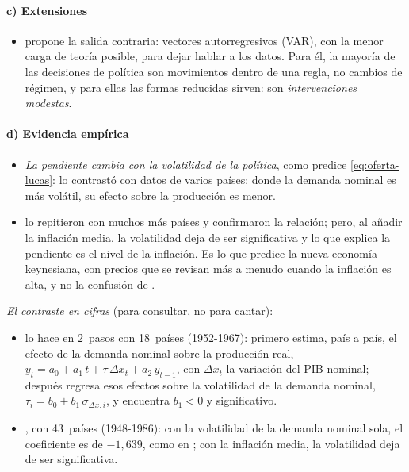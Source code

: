 \documentclass[11pt]{article}
\begin{document}
\paragraph{c) Extensiones}

\begin{itemize}
\item \textcite{Sims1980Macroeconomics} propone la salida contraria: vectores autorregresivos (VAR), con la menor carga de teoría posible, para dejar hablar a los datos. Para él, la mayoría de las decisiones de política son movimientos dentro de una regla, no cambios de régimen, y para ellas las formas reducidas sirven: son \emph{intervenciones modestas}\nocite{LeeperZha2003Modest}.
\end{itemize}

\paragraph{d) Evidencia empírica}

\begin{itemize}
\item \emph{La pendiente cambia con la volatilidad de la política}, como predice \eqref{eq:oferta-lucas}: \textcite{Lucas1973Some} lo contrastó con datos de varios países: donde la demanda nominal es más volátil, su efecto sobre la producción es menor.
\item \textcite{BallMankiwRomer1988} lo repitieron con muchos más países y confirmaron la relación; pero, al añadir la inflación media, la volatilidad deja de ser significativa y lo que explica la pendiente es el nivel de la inflación. Es lo que predice la nueva economía keynesiana, con precios que se revisan más a menudo cuando la inflación es alta, y no la confusión de  .
\end{itemize}

\begin{anotaciones}
\emph{El contraste en cifras} (para consultar, no para cantar):
\begin{itemize}
\item \textcite{Lucas1973Some} lo hace en 2~pasos con 18~países (1952-1967): primero estima, país a país, el efecto de la demanda nominal sobre la producción real, $y_t=a_0+a_1\,t+\tau\,\Delta x_t+a_2\,y_{t-1}$, con $\Delta x_t$ la variación del PIB nominal; después regresa esos efectos sobre la volatilidad de la demanda nominal, $\tau_i=b_0+b_1\,\sigma_{\Delta x,i}$, y encuentra $b_1<0$ y significativo.
\item \textcite{BallMankiwRomer1988}, con 43~países (1948-1986): con la volatilidad de la demanda nominal sola, el coeficiente es de $-1{,}639$, como en ; con la inflación media, la volatilidad deja de ser significativa\nocite{BallMankiwRomer1988}.
\end{itemize}
\end{anotaciones}
\end{document}

